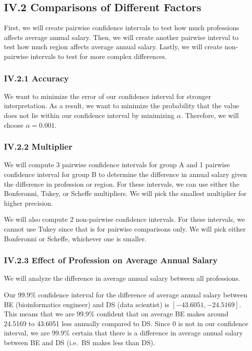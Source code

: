 \documentclass[
]{article}
\begin{document}
\subsection{IV.2 Comparisons of Different
Factors}\label{iv.2-comparisons-of-different-factors}

First, we will create pairwise confidence intervals to test how much
professions affects average annual salary. Then, we will create another
pairwise interval to test how much region affects average annual salary.
Lastly, we will create non-pairwise intervals to test for more complex
differences.

\subsubsection{IV.2.1 Accuracy}\label{iv.2.1-accuracy}

We want to minimize the error of our confidence interval for stronger
interpretation. As a result, we want to minimize the probability that
the value does not lie within our confidence interval by minimizing
\(\alpha\). Therefore, we will choose \(\alpha = 0.001\).

\subsubsection{IV.2.2 Multiplier}\label{iv.2.2-multiplier}

We will compute 3 pairwise confidence intervals for group A and 1
pairwise confidence interval for group B to determine the difference in
annual salary given the difference in profession or region. For these
intervals, we can use either the Bonferonni, Tukey, or Scheffe
multipliers. We will pick the smallest multiplier for higher precision.

We will also compute 2 non-pairwise confidence intervals. For these
intervals, we cannot use Tukey since that is for pairwise comparisons
only. We will pick either Bonferonni or Scheffe, whichever one is
smaller.

\subsubsection{IV.2.3 Effect of Profession on Average Annual
Salary}\label{iv.2.3-effect-of-profession-on-average-annual-salary}

We will analyze the difference in average annual salary between all
professions.

Our 99.9\% confidence interval for the difference of average annual
salary between BE (bioinformatics engineer) and DS (data scientist) is
\([-43.6051, -24.5169]\). This means that we are 99.9\% confident that
on average BE makes around 24.5169 to 43.6051 less annually compared to
DS. Since 0 is not in our confidence interval, we are 99.9\% certain
that there is a difference in average annual salary between BE and DS
(i.e.~BS makes less than DS).
\end{document}

